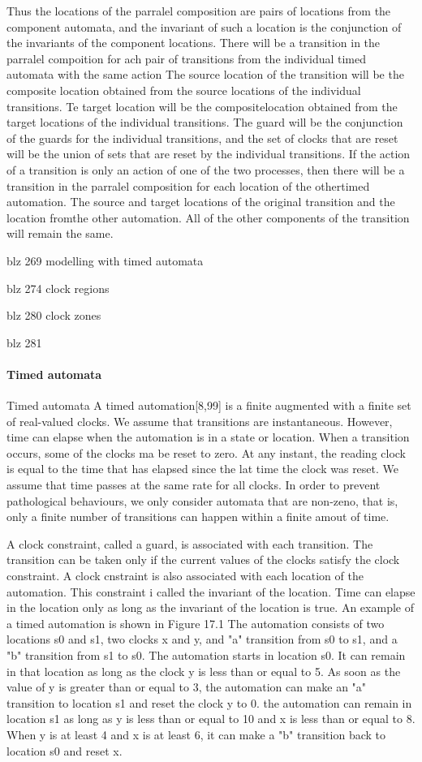 Thus the locations of the parralel composition are pairs of locations from the component automata, and the invariant of such a location is the conjunction of the invariants of the component locations. There will be a transition in the parralel compoition for ach pair of transitions from the individual timed automata with the same action The source location of the transition will be the composite location obtained from the source locations of the individual transitions. Te target location will be the compositelocation obtained from the target locations of the individual transitions. The guard will be the conjunction of the guards for the individual transitions, and the set of clocks that are reset will be the union of sets that are reset by the individual transitions. If the action of  a transition is only an action of one of the two processes, then there will be a transition in the parralel composition for each location of the othertimed automation. The source and target locations of the original transition and the location fromthe other automation. All of the other components of the transition will remain the same.


blz 269 modelling with timed automata

blz 274 clock regions

blz 280 clock zones

blz 281
\paragraph{Timed automata}
Timed automata
A timed automation[8,99] is a finite augmented with a finite set of  real-valued clocks. We assume that transitions are instantaneous. However, time can elapse when the automation is in a state or location. When a transition occurs, some of the clocks ma be reset to zero. At any instant, the reading clock is equal to the time that has elapsed since the lat time the clock was reset. We assume that time passes at the same rate for all clocks. In order to prevent pathological behaviours, we only consider automata that are non-zeno, that is, only a finite number of transitions can happen within a finite amout of time.

A clock constraint, called a guard, is associated with each transition. The transition can be taken only if the current values of the clocks satisfy the clock constraint. A clock cnstraint is also associated with each location of the automation. This constraint i called the invariant of the location. Time can elapse in the location only as long as the invariant of the location is true. An example of a timed automation is shown in Figure 17.1 The automation consists of two locations s0 and s1, two clocks x and y, and "a" transition from s0 to s1, and a "b" transition from s1 to s0. The automation starts in location s0. It can remain in that location as long as the clock y is less than or equal to 5. As soon as the value of y is greater than or equal to 3, the  automation can make an "a" transition to location s1 and reset the clock y to 0. the automation can remain in location s1 as long as y is less than or equal to 10 and x is less than or equal to 8. When y is at least 4 and x is at least 6, it can make a "b" transition back to location s0 and reset x.

